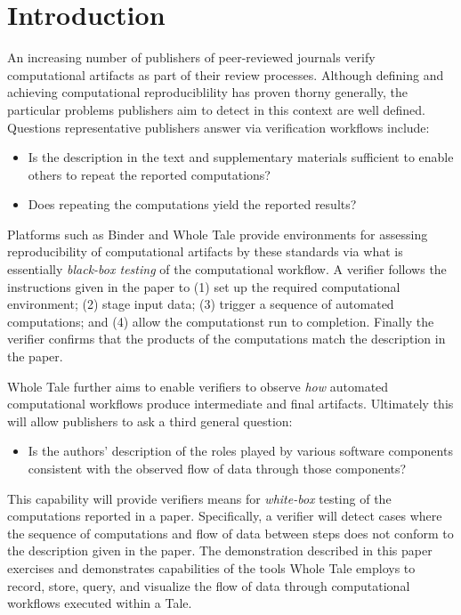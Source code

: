 \section{Introduction}

An increasing number of publishers of peer-reviewed journals verify computational artifacts as part of their review processes. Although defining and achieving computational reproduciblility has proven thorny generally, the particular problems publishers aim to detect in this context are well defined. Questions representative publishers answer via verification workflows include:

\begin{itemize}[label=\raisebox{0.25ex}{\tiny$\bullet$}]

\item Is the description in the text and supplementary materials sufficient to enable others to repeat the reported computations?

\item Does repeating the computations yield the reported results?

\end{itemize}

Platforms such as Binder \cite{Binder_2018} and Whole Tale  \cite{brinckman2019computing} provide environments for assessing reproducibility of computational artifacts by these standards via what is essentially \emph{black-box testing} of the computational workflow. A verifier follows the instructions given in the paper to (1) set up the required computational environment; (2) stage input data; (3) trigger a sequence of automated computations; and (4) allow the computationst run to completion.  Finally the verifier confirms that the products of the computations match the description in the paper.

Whole Tale further aims to enable verifiers to observe \emph{how} automated computational workflows produce intermediate and final artifacts. Ultimately this will allow publishers to ask a third general question:

\begin{itemize}[label=\raisebox{0.25ex}{\tiny$\bullet$}]

\item Is the authors' description of the roles played by various software components consistent with the observed flow of data through those components?

\end{itemize}

This capability will provide verifiers means for \emph{white-box} testing of the computations reported in a paper. Specifically, a verifier will detect cases where the sequence of computations and flow of data between steps does not conform to the description given in the paper. The demonstration described in this paper exercises and demonstrates capabilities of the tools Whole Tale employs to record, store, query, and visualize the flow of data through computational workflows executed within a Tale.








